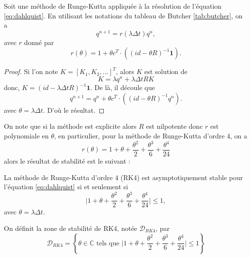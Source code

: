 \begin{proposition}
Soit une méthode de Runge-Kutta appliquée à la résolution de l'équation \eqref{eq:dahlquist}. En utilisant les notations du tableau de Butcher \ref{tab:butcher}, on a 
\begin{equation}
q^{n+1} = r(\lambda \Delta t) q^n,
\end{equation}
avec $r$ donné par 
\begin{equation}
r(\theta) = 1 + \theta c^T \cdot \left( (id - \theta R)^{-1} \mathbf{1} \right).
\end{equation}
\end{proposition}

\begin{proof}
Si l'on note $K = [K_1, K_2, ...]^T$, alors $K$ est solution de 
\begin{equation}
K = \lambda q^n +  \lambda \Delta t R K
\end{equation}
donc, $K = (id - \lambda \Delta t R)^{-1} \mathbf{1}$.
De là, il découle que 
\begin{equation}
q^{n+1} = q^n + \theta c^T \cdot \left( (id - \theta R)^{-1} q^n \right).
\end{equation} 
avec $\theta = \lambda \Delta t$. D'où le résultat.
\end{proof}
On note que si la méthode est explicite alors $R$ est nilpotente donc $r$ est polynomiale en $\theta$, 
en particulier, pour la méthode de Runge-Kutta d'ordre 4, on a 
\begin{equation}
r(\theta) = 1 + \theta + \dfrac{\theta^2}{2} + \dfrac{\theta^3}{6} + \dfrac{\theta^4}{24} 
\end{equation}
alors le résultat de stabilité est le suivant :
\begin{proposition}
La méthode de Runge-Kutta d'ordre 4 (RK4) est asymptotiquement stable pour l'équation \eqref{eq:dahlquist} si et seulement si
\begin{equation}
\vert 1 + \theta + \dfrac{\theta^2}{2} + \dfrac{\theta^3}{6} + \dfrac{\theta^4}{24}  \vert \leq 1,
\end{equation}
avec $\theta = \lambda \Delta t$.
\end{proposition}
On définit la zone de stabilité de RK4, notée $\mathcal{D}_{RK4}$, par
\begin{equation}
\mathcal{D}_{RK4} = \left\lbrace \theta \in \mathbb{C} \text{ tels que } \vert 1 + \theta + \dfrac{\theta^2}{2} + \dfrac{\theta^3}{6} + \dfrac{\theta^4}{24}  \vert \leq 1 \right\rbrace
\end{equation} 
